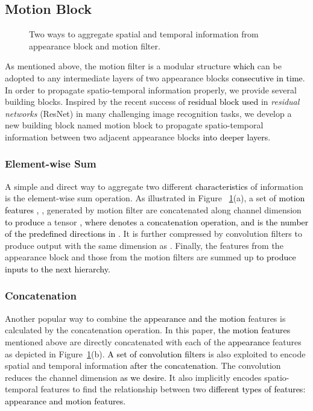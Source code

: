 \documentclass[runningheads]{llncs}
\newcommand{\nj}[1]{\textcolor{black}{#1}}
\newcommand{\mg}[1]{\textcolor{black}{#1}}
\begin{document}
\subsection{Motion Block}

\begin{figure}[t]
	\centering
    \caption{Two ways to aggregate spatial and temporal information from appearance block and motion filter.}
    \label{fig:motionblock}
\end{figure}

As mentioned above, the motion filter is a modular structure \nj{which} can be adopted to any intermediate layers of two appearance blocks \nj{consecutive in time}. In order to propagate spatio-temporal information properly, we provide several building blocks. Inspired by the recent success of \mg{residual block used} in \textit{residual networks} (ResNet) in many challenging image recognition tasks, we develop a new building block named motion block to propagate spatio-temporal information between two adjacent appearance blocks \nj{into deeper layers}.

\subsubsection*{Element-wise Sum}
A simple and direct way to aggregate two different \nj{characteristics} of information is the element-wise sum operation. As illustrated in Figure ~\ref{fig:motionblock}(a), a set of \nj{motion features , }, generated by motion filter are concatenated along channel dimension \nj{to produce} a tensor \nj{, where  denotes a concatenation operation,  and  is the number of the predefined directions in .} It is further compressed by  convolution filters to produce output  with the same dimension as . Finally, the features from the appearance block  and those from the motion filters  are summed up \nj{to produce inputs to the next hierarchy.}

\subsubsection*{Concatenation}
Another popular way to combine the \nj{appearance and the motion} features is calculated by the concatenation operation. In this paper, \nj{the motion features } mentioned above are directly concatenated with each of the \nj{appearance} features  as depicted in Figure~\ref{fig:motionblock}(b). \nj{A set of  convolution filters} is  also exploited to encode spatial and temporal information \nj{after the concatenation}. The  convolution reduces the channel dimension \nj{as we desire.}
It also implicitly encodes spatio-temporal features to find the relationship between two \nj{different types of features: appearance and motion features.} 
\end{document}
